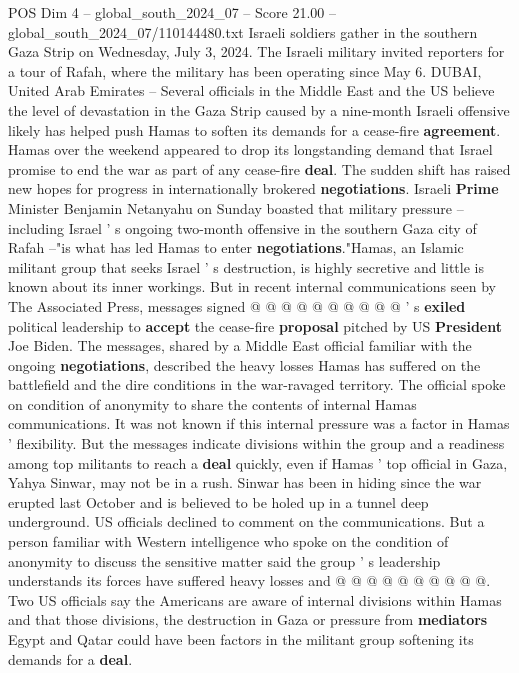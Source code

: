 \begin{textsample}{POS Dim 4 – global\_south\_2024\_07 – Score 21.00 – global\_south\_2024\_07/110144480.txt}  \label{ex:f4_pos_120}
Israeli soldiers gather in the southern Gaza Strip on Wednesday, July 3, 2024.
The Israeli military invited reporters for a tour of Rafah, where the military has been operating since May 6.
DUBAI, United Arab Emirates -- Several officials in the Middle East and the US believe the level of devastation in the Gaza Strip caused by a nine-month Israeli offensive likely has helped push Hamas to soften its demands for a cease-fire \textbf{agreement}.
Hamas over the weekend appeared to drop its longstanding demand that Israel promise to end the war as part of any cease-fire \textbf{deal}.
The sudden shift has raised new hopes for progress in internationally brokered \textbf{negotiations}.
Israeli \textbf{Prime} Minister Benjamin Netanyahu on Sunday boasted that military pressure -- including Israel ' s ongoing two-month offensive in the southern Gaza city of Rafah --"is what has led Hamas to enter \textbf{negotiations}."Hamas, an Islamic militant group that seeks Israel ' s destruction, is highly secretive and little is known about its inner workings.
But in recent internal communications seen by The Associated Press, messages signed @ @ @ @ @ @ @ @ @ @ ' s \textbf{exiled} political leadership to \textbf{accept} the cease-fire \textbf{proposal} pitched by US \textbf{President} Joe Biden.
The messages, shared by a Middle East official familiar with the ongoing \textbf{negotiations}, described the heavy losses Hamas has suffered on the battlefield and the dire conditions in the war-ravaged territory.
The official spoke on condition of anonymity to share the contents of internal Hamas communications.
It was not known if this internal pressure was a factor in Hamas ' flexibility.
But the messages indicate divisions within the group and a readiness among top militants to reach a \textbf{deal} quickly, even if Hamas ' top official in Gaza, Yahya Sinwar, may not be in a rush.
Sinwar has been in hiding since the war erupted last October and is believed to be holed up in a tunnel deep underground.
US officials declined to comment on the communications.
But a person familiar with Western intelligence who spoke on the condition of anonymity to discuss the sensitive matter said the group ' s leadership understands its forces have suffered heavy losses and @ @ @ @ @ @ @ @ @ @.
Two US officials say the Americans are aware of internal divisions within Hamas and that those divisions, the destruction in Gaza or pressure from \textbf{mediators} Egypt and Qatar could have been factors in the militant group softening its demands for a \textbf{deal}.

\end{textsample}
